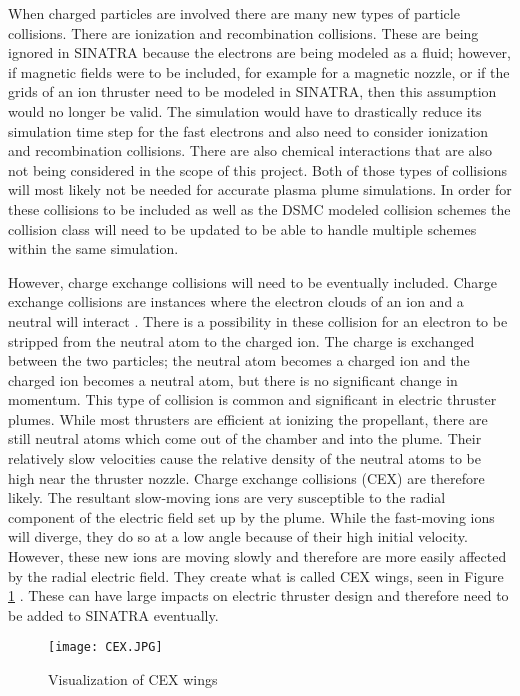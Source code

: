 \indent When charged particles are involved there are many new types of particle collisions. There are ionization and recombination collisions. These are being ignored in SINATRA because the electrons are being modeled as a fluid; however, if magnetic fields were to be included, for example for a magnetic nozzle, or if the grids of an ion thruster need to be modeled in SINATRA, then this assumption would no longer be valid. The simulation would have to drastically reduce its simulation time step for the fast electrons and also need to consider ionization and recombination collisions. There are also chemical interactions that are also not being considered in the scope of this project. Both of those types of collisions will most likely not be needed for accurate plasma plume simulations. In order for these collisions to be included as well as the DSMC modeled collision schemes the collision class will need to be updated to be able to handle multiple schemes within the same simulation. \par

\indent However, charge exchange collisions will need to be eventually included. Charge exchange collisions are instances where the electron clouds of an ion and a neutral will interact \cite{pic_generic}. There is a possibility in these collision for an electron to be stripped from the neutral atom to the charged ion. The charge is exchanged between the two particles; the neutral atom becomes a charged ion and the charged ion becomes a neutral atom, but there is no significant change in momentum. This type of collision is common and significant in electric thruster plumes. While most thrusters are efficient at ionizing the propellant, there are still neutral atoms which come out of the chamber and into the plume. Their relatively slow velocities cause the relative density of the neutral atoms to be high near the thruster nozzle. Charge exchange collisions (CEX) are therefore likely. The resultant slow-moving ions are very susceptible to the radial component of the electric field set up by the plume. While the fast-moving ions will diverge, they do so at a low angle because of their high initial velocity. However, these new ions are moving slowly and therefore are more easily affected by the radial electric field. They create what is called CEX wings, seen in Figure \ref{fig:CEX} \cite{cex_wings}. These can have large impacts on electric thruster design and therefore need to be added to SINATRA eventually.


\begin{figure}
\texttt{[image: CEX.JPG]}
\centering
\caption[Visualization of CEX wings]{Visualization of CEX wings \cite{cex_wings}}
\label{fig:CEX}
\end{figure}

